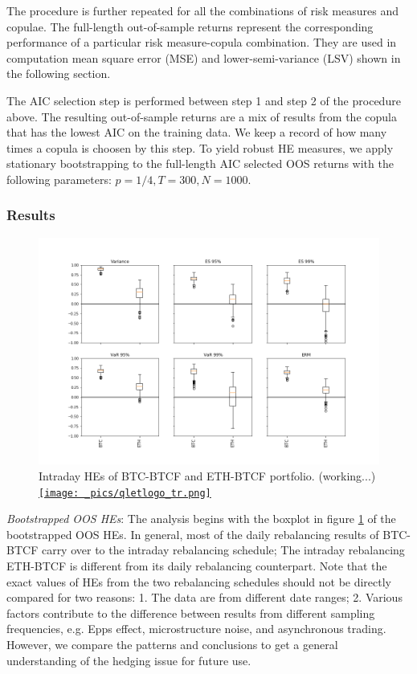 \documentclass[11pt,a4paper,english]{article}
\begin{document}
The procedure is further repeated for all the combinations of risk measures and copulae.
The full-length out-of-sample returns represent the corresponding performance of a particular risk measure-copula combination.
They are used in computation mean square error (MSE) and lower-semi-variance (LSV) shown in the following section.

The AIC selection step is performed between step 1 and step 2 of the procedure above.
The resulting out-of-sample returns are a mix of results from the copula that has the lowest AIC on the training data.
We keep a record of how many times a copula is choosen by this step.
To yield robust HE measures, we apply stationary bootstrapping to the full-length AIC selected OOS returns with the following parameters: $p=1/4, T=300, N=1000$.

\subsubsection{Results}
\begin{figure}[t]
\includegraphics[width=\textwidth]{_pics/hourly_HE.png}
  \caption{Intraday HEs of BTC-BTCF and ETH-BTCF portfolio. (working...)
  \href{http://www.quantlet.com/}{\texttt{[image: \_pics/qletlogo\_tr.png]}} }
\label{fig:HEboxplot_intraday}
\end{figure}

\textit{Bootstrapped OOS HEs}: The analysis begins with the boxplot in figure \ref{fig:HEboxplot_intraday} of the bootstrapped OOS HEs.
In general, most of the daily rebalancing results of BTC-BTCF carry over to the intraday rebalancing schedule;
The intraday rebalancing ETH-BTCF is different from its daily rebalancing counterpart.
Note that the exact values of HEs from the two rebalancing schedules should not be directly compared for two reasons: 1. The data are from different date ranges; 2. Various factors contribute to the difference between results from different sampling frequencies, e.g. Epps effect, microstructure noise,
and asynchronous trading.
However, we compare the patterns and conclusions to get a general understanding of the hedging issue for future use.
\end{document}
